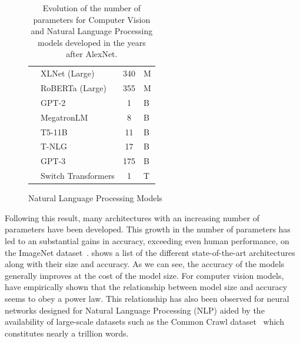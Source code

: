 \begin{table}[t]
\begin{subfigure}[b]{\textwidth}
\begin{tabular}{
      L{4.5cm}
      L{4.5cm}
      S[table-format=3.0, table-text-alignment=left]@{\,}
      s[table-unit-alignment=left]
    }
      \citet{yang2019xlnet}          & XLNet (Large)   & 340 & \si{M} \\
      \citet{liu2019roberta}         & RoBERTa (Large) & 355 & \si{M} \\
      \citet{radford2019language}    & GPT-2           &   1 & \si{B} \\
      \citet{shoeybi2019megatron}    & MegatronLM      &   8 & \si{B} \\
      \citet{raffel2020exploring}    & T5-11B          &  11 & \si{B} \\
      \citet{rosset2020turingnlg}    & T-NLG           &  17 & \si{B} \\
      \citet{brown2020language}      & GPT-3           & 175 & \si{B} \\
      \citet{fedus2021switch}        & Switch Transformers & 1 & \si{T} \\
      \bottomrule
    \end{tabular}
    \caption{Natural Language Processing Models}
    \label{table:ch1-networks_parameters_nlp}
  \end{subfigure}
  \par\bigskip
  \caption{Evolution of the number of parameters for Computer Vision and Natural Language Processing models developed in the years after AlexNet.}
  \label{table:ch1-networks_parameters}
\end{table}


Following this result, many architectures with an increasing number of parameters have been developed.
This growth in the number of parameters has led to an substantial gains in accuracy, exceeding even human performance, on the ImageNet dataset~\cite{he2015delving}.
 shows a list of the different state-of-the-art architectures along with their size and accuracy.
As we can see, the accuracy of the models generally improves at the cost of the model size.
For computer vision models, \citet{tan2019efficientnet} have empirically shown that the relationship between model size and accuracy seems to obey a power law.
This relationship has also been observed for neural networks designed for Natural Language Processing (NLP) \cite{rosenfeld2020a,kaplan2020scaling} aided by the availability of large-scale datasets such as the Common Crawl dataset~\cite{raffel2020exploring} which constitutes nearly a trillion words.

